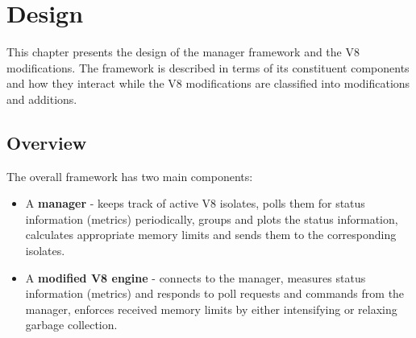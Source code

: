 \documentclass{l4proj}
\begin{document}
\chapter{Design}
\hspace*{3em} This chapter presents the design of the manager framework and the V8 modifications. The framework is described in terms of its constituent components and how they interact while the V8 modifications are classified into modifications and additions.
\section{Overview}

The overall framework has two main components:
\begin{itemize}
\item A \textbf{manager} - keeps track of active V8 isolates, polls them for status information (metrics) periodically, groups and plots the status information, calculates appropriate memory limits and sends them to the corresponding isolates.
\item A \textbf{modified V8 engine} - connects to the manager, measures status information (metrics) and responds to poll requests and commands from the manager, enforces received memory limits by either intensifying or relaxing garbage collection.
\end{itemize}
\end{document}
